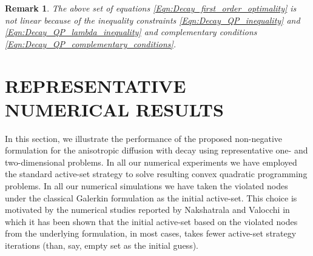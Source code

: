 \documentclass[11pt]{amsart}
\newtheorem{remark}[theorem]{Remark}
\begin{document}
\begin{remark}
  The above set of equations \eqref{Eqn:Decay_first_order_optimality} is not 
  linear because of the inequality constraints \eqref{Eqn:Decay_QP_inequality} 
  and \eqref{Eqn:Decay_QP_lambda_inequality} and complementary conditions 
  \eqref{Eqn:Decay_QP_complementary_conditions}.  
\end{remark} 
\section{REPRESENTATIVE NUMERICAL RESULTS}
\label{Sec:Decay_NR}
In this section, we illustrate the performance of the proposed non-negative formulation 
for the anisotropic diffusion with decay using representative one- and two-dimensional 
problems. 
In all our numerical experiments we have employed the standard active-set strategy 
\cite{Luenberger_Ye_Nonlinear_Programming} to solve resulting convex quadratic 
programming problems. In all our numerical simulations we have taken the violated 
nodes under the classical Galerkin formulation as the initial active-set. This choice 
is motivated by the numerical studies reported by Nakshatrala and Valocchi 
\cite{Nakshatrala_Valocchi_JCP_2009_v228_p6726} in which it has been shown that the 
initial active-set based on the violated nodes from the underlying formulation, in most cases, 
takes fewer active-set strategy iterations (than, say, empty set as the initial guess). 
\end{document}
